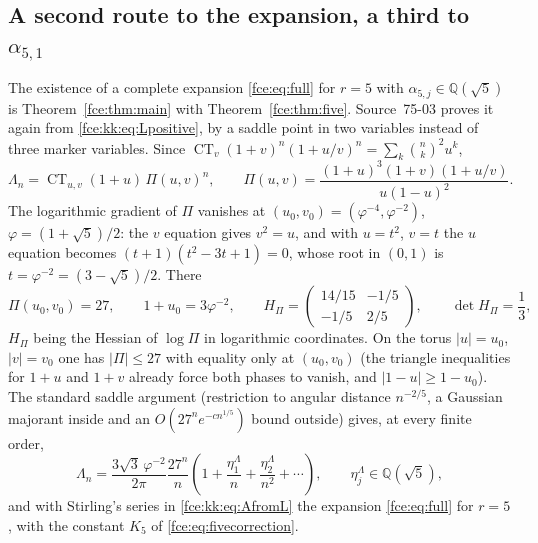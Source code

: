 \documentclass[11pt,a4paper]{article}
\numberwithin{equation}{section}
\theoremstyle{definition}\newtheorem{definition}[theorem]{Definition}
\theoremstyle{remark}\newtheorem{remark}[theorem]{Remark}
\newcommand{\Q}{\mathbb Q}
\newcommand{\ct}{\operatorname{CT}}
\begin{document}
\subsection{A second route to the expansion, a third to \texorpdfstring{$\alpha_{5,1}$}{alpha(5,1)}}\label{fce:kk:sec:saddle}
The existence of a complete expansion \eqref{fce:eq:full} for $r=5$ with
$\alpha_{5,j}\in\Q(\sqrt5)$ is Theorem~\ref{fce:thm:main} with
Theorem~\ref{fce:thm:five}. Source~75-03 proves it again from
\eqref{fce:kk:eq:Lpositive}, by a saddle point in two variables instead of
three marker variables. Since
$\ct_v(1+v)^n(1+u/v)^n=\sum_k\binom nk^2u^k$,
\begin{equation}\label{fce:kk:eq:constantterm}
 \Lambda_n=\ct_{u,v}(1+u)\,\Pi(u,v)^n,\qquad
 \Pi(u,v)=\frac{(1+u)^3(1+v)(1+u/v)}{u(1-u)^2}.
\end{equation}
The logarithmic gradient of $\Pi$ vanishes at
$(u_0,v_0)=(\varphi^{-4},\varphi^{-2})$, $\varphi=(1+\sqrt5)/2$: the $v$
equation gives $v^2=u$, and with $u=t^2$, $v=t$ the $u$ equation becomes
$(t+1)(t^2-3t+1)=0$, whose root in $(0,1)$ is $t=\varphi^{-2}=(3-\sqrt5)/2$.
There
\[
 \Pi(u_0,v_0)=27,\qquad 1+u_0=3\varphi^{-2},\qquad
 H_\Pi=\begin{pmatrix}14/15&-1/5\\-1/5&2/5\end{pmatrix},\qquad
 \det H_\Pi=\frac13,
\]
$H_\Pi$ being the Hessian of $\log\Pi$ in logarithmic coordinates. On the
torus $|u|=u_0$, $|v|=v_0$ one has $|\Pi|\le27$ with equality only at
$(u_0,v_0)$ (the triangle inequalities for $1+u$ and $1+v$ already force
both phases to vanish, and $|1-u|\ge1-u_0$). The standard saddle argument
(restriction to angular distance $n^{-2/5}$, a Gaussian majorant inside and
an $O(27^ne^{-cn^{1/5}})$ bound outside) gives, at every finite order,
\begin{equation}\label{fce:kk:eq:Lasympt}
 \Lambda_n=\frac{3\sqrt3\,\varphi^{-2}}{2\pi}\frac{27^n}{n}
 \left(1+\frac{\eta^\Lambda_1}{n}+\frac{\eta^\Lambda_2}{n^2}+\cdots\right),
 \qquad \eta^\Lambda_j\in\Q(\sqrt5),
\end{equation}
and with Stirling's series in \eqref{fce:kk:eq:AfromL} the expansion
\eqref{fce:eq:full} for $r=5$, with the constant $K_5$ of
\eqref{fce:eq:fivecorrection}.
\end{document}
